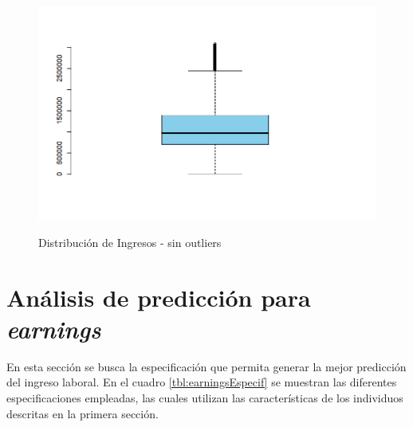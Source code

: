 \documentclass[11pt,a4paper]{article}
\begin{document}
\begin{figure}[H]
    \centering
    \caption{Distribución de Ingresos - sin outliers}
    \includegraphics[width=\textwidth]{../views/ajustado.png}
    \label{fig:ajustado}
\end{figure}

\section{Análisis de predicción para \emph{earnings}}

En esta sección se busca la especificación que permita generar la mejor predicción del ingreso laboral.
En el cuadro \ref{tbl:earningsEspecif} se muestran las diferentes especificaciones empleadas, las cuales utilizan las características de los individuos descritas en la primera sección.
\end{document}
